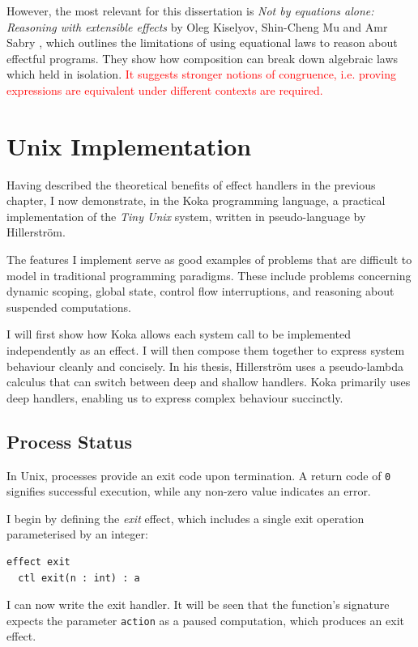 \documentclass[logo,bsc,singlespacing,parskip]{infthesis}
\begin{document}
However, the most relevant for this dissertation is \textit{Not by equations alone: Reasoning with extensible effects} by Oleg Kiselyov, Shin-Cheng Mu and Amr Sabry \cite{kiselyov2021not}, which outlines the limitations of using equational laws to reason about effectful programs. They show how composition can break down algebraic laws which held in isolation. \textcolor{red}{It suggests stronger notions of congruence, i.e. proving expressions are equivalent under different contexts are required.}



\chapter{Unix Implementation}
Having described the theoretical benefits of effect handlers in the previous chapter, I now demonstrate, in the Koka programming language, a practical implementation of the \textit{Tiny Unix} system, written in pseudo-language by Hillerström. 

The features I implement serve as good examples of problems that are difficult to model in traditional programming paradigms. These include problems concerning dynamic scoping, global state, control flow interruptions, and reasoning about suspended computations.

I will first show how Koka allows each system call to be implemented independently as an effect. I will then compose them together to express system behaviour cleanly and concisely.
In his thesis, Hillerström uses a pseudo-lambda calculus that can switch between deep and shallow handlers. Koka primarily uses deep handlers, enabling us to express complex behaviour succinctly.



\section{Process Status}
In Unix, processes provide an exit code upon termination. A return code of \lstinline{0} signifies successful execution, while any non-zero value indicates an error. 

I begin by defining the \textit{exit} effect, which includes a single exit operation parameterised by an integer:
\begin{lstlisting}
effect exit
  ctl exit(n : int) : a
\end{lstlisting}

\vspace{1em}
I can now write the exit handler. It will be seen that the function's signature expects the parameter \lstinline{action} as a paused computation, which produces an exit effect.
\end{document}
